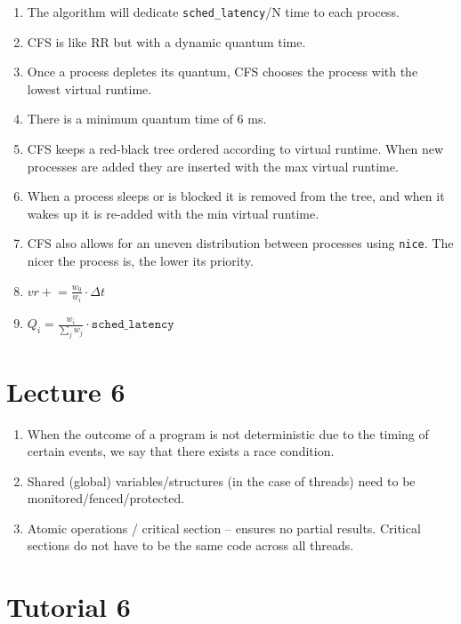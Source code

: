 \documentclass[12pt,a4paper]{article}
\begin{document}
\begin{enumerate}
  \item The algorithm will dedicate \texttt{sched\_latency}/N time to each process.
  \item CFS is like RR but with a dynamic quantum time.
  \item Once a process depletes its quantum, CFS chooses the process with the lowest virtual runtime.
  \item There is a minimum quantum time of 6 ms.
  \item CFS keeps a red-black tree ordered according to virtual runtime. When new processes are added they are inserted with the max virtual runtime.
  \item When a process sleeps or is blocked it is removed from the tree, and when it wakes up it is re-added with the min virtual runtime.
  \item CFS also allows for an uneven distribution between processes using \texttt{nice}. The nicer the process is, the lower its priority.
  \item $vr \mathrel{+}= \frac{w_0}{w_i} \cdot \Delta t$
  \item $Q_i = \frac{w_i}{\sum_j w_j} \cdot \texttt{sched\_latency}$
\end{enumerate}

\section{Lecture 6}

\begin{enumerate}
  \item When the outcome of a program is not deterministic due to the timing of certain events, we say that there exists a race condition.
  \item Shared (global) variables/structures (in the case of threads) need to be monitored/fenced/protected.
  \item Atomic operations / critical section -- ensures no partial results. Critical sections do not have to be the same code across all threads.
\end{enumerate}

\section{Tutorial 6}
\end{document}
